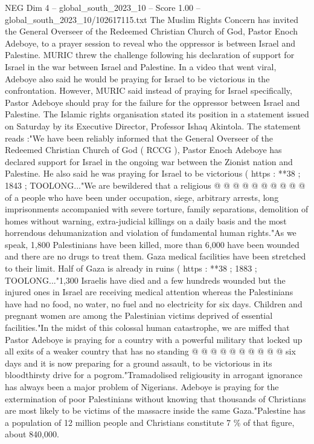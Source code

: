 \begin{textsample}{NEG Dim 4 – global\_south\_2023\_10 – Score 1.00 – global\_south\_2023\_10/102617115.txt}  \label{ex:f4_neg_029}
The Muslim Rights Concern has invited the General Overseer of the Redeemed Christian Church of God, Pastor Enoch Adeboye, to a prayer session to reveal who the oppressor is between Israel and Palestine.
MURIC threw the challenge following his declaration of support for Israel in the war between Israel and Palestine.
In a video that went viral, Adeboye also said he would be praying for Israel to be victorious in the confrontation.
However, MURIC said instead of praying for Israel specifically, Pastor Adeboye should pray for the failure for the oppressor between Israel and Palestine.
The Islamic rights organisation stated its position in a statement issued on Saturday by its Executive Director, Professor Ishaq Akintola.
The statement reads :"We have been reliably informed that the General Overseer of the Redeemed Christian Church of God ( RCCG ), Pastor Enoch Adeboye has declared support for Israel in the ongoing war between the Zionist nation and Palestine.
He also said he was praying for Israel to be victorious ( https : **38 ; 1843 ; TOOLONG..."We are bewildered that a religious @ @ @ @ @ @ @ @ @ @ of a people who have been under occupation, siege, arbitrary arrests, long imprisonments accompanied with severe torture, family separations, demolition of homes without warning, extra-judicial killings on a daily basis and the most horrendous dehumanization and violation of fundamental human rights."As we speak, 1,800 Palestinians have been killed, more than 6,000 have been wounded and there are no drugs to treat them.
Gaza medical facilities have been stretched to their limit.
Half of Gaza is already in ruins ( https : **38 ; 1883 ; TOOLONG..."1,300 Israelis have died and a few hundreds wounded but the injured ones in Israel are receiving medical attention whereas the Palestinians have had no food, no water, no fuel and no electricity for six days.
Children and pregnant women are among the Palestinian victims deprived of essential facilities."In the midst of this colossal human catastrophe, we are miffed that Pastor Adeboye is praying for a country with a powerful military that locked up all exits of a weaker country that has no standing @ @ @ @ @ @ @ @ @ @ six days and it is now preparing for a ground assault, to be victorious in its bloodthirsty drive for a pogrom."Tramadolised religiousity in arrogant ignorance has always been a major problem of Nigerians.
Adeboye is praying for the extermination of poor Palestinians without knowing that thousands of Christians are most likely to be victims of the massacre inside the same Gaza."Palestine has a population of 12 million people and Christians constitute 7 \% of that figure, about 840,000.

\end{textsample}
